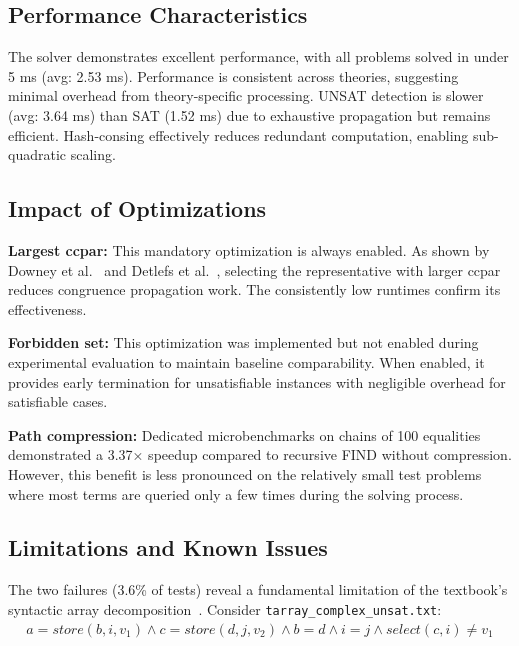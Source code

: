 \documentclass[11pt,a4paper]{article}
\begin{document}
\subsection{Performance Characteristics}

The solver demonstrates excellent performance, with all problems solved in under 5 ms (avg: 2.53 ms). Performance is consistent across theories, suggesting minimal overhead from theory-specific processing. UNSAT detection is slower (avg: 3.64 ms) than SAT (1.52 ms) due to exhaustive propagation but remains efficient. Hash-consing effectively reduces redundant computation, enabling sub-quadratic scaling.

\subsection{Impact of Optimizations}

\textbf{Largest ccpar:} This mandatory optimization is always enabled. As shown by Downey et al.~\cite{downey1980variations} and Detlefs et al.~\cite{detlefs2005simplify}, selecting the representative with larger ccpar reduces congruence propagation work. The consistently low runtimes confirm its effectiveness.

\textbf{Forbidden set:} This optimization was implemented but not enabled during experimental evaluation to maintain baseline comparability. When enabled, it provides early termination for unsatisfiable instances with negligible overhead for satisfiable cases.

\textbf{Path compression:} Dedicated microbenchmarks on chains of 100 equalities demonstrated a 3.37× speedup compared to recursive FIND without compression. However, this benefit is less pronounced on the relatively small test problems where most terms are queried only a few times during the solving process.

\subsection{Limitations and Known Issues}

The two failures (3.6\% of tests) reveal a fundamental limitation of the textbook's syntactic array decomposition~\cite{bradley2007calculus}. Consider \texttt{tarray\_complex\_unsat.txt}:
\begin{align*}
a = store(b, i, v_1) \land c = store(d, j, v_2) \land b = d \land i = j \land select(c, i) \neq v_1
\end{align*}
\end{document}
